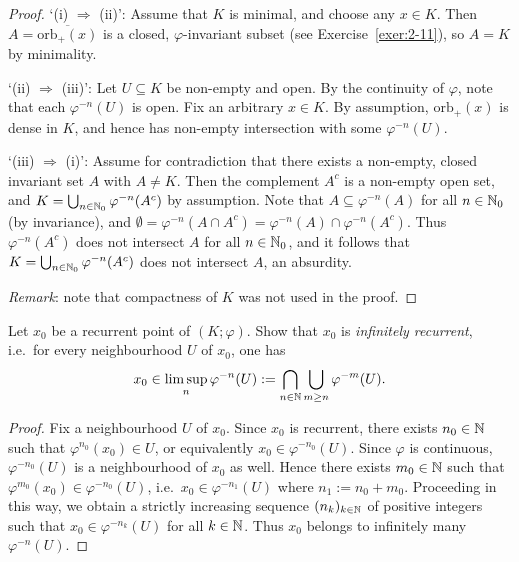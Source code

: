 \begin{proof}
	`(i) $\Rightarrow$ (ii)': Assume that $K$ is minimal, and choose any $x\in K$. Then $A = \overline{\mathrm{orb}_+(x)}$ is a closed, $\varphi$-invariant subset (see Exercise~\ref{exer:2-11}), so $A=K$ by minimality.
	
	`(ii) $\Rightarrow$ (iii)': Let $U \subseteq K$ be non-empty and open. By the continuity of $\varphi$, note that each $\varphi^{-n}(U)$ is open. Fix an arbitrary $x\in K$. By assumption, $\mathrm{orb}_+(x)$ is dense in $K$, and hence has non-empty intersection with some $\varphi^{-n}(U)$.
	
	`(iii) $\Rightarrow$ (i)': Assume for contradiction that there exists a non-empty, closed invariant set $A$ with $A \ne K$. Then the complement $A^c$ is a non-empty open set, and $K = \bigcup_{n\in\mathbb{N}_0} \varphi^{-n}(A^c)$ by assumption. Note that $A \subseteq \varphi^{-n}(A)$ for all $n\in\mathbb{N}_0$ (by invariance), and $\emptyset = \varphi^{-n}(A \cap A^c) = \varphi^{-n}(A) \cap \varphi^{-n}(A^c)$. Thus $\varphi^{-n}(A^c)$ does not intersect $A$ for all $n\in\mathbb{N}_0$, and it follows that $K = \bigcup_{n\in\mathbb{N}_0} \varphi^{-n}(A^c)$ does not intersect $A$, an absurdity.
	
	\emph{Remark}: note that compactness of $K$ was not used in the proof.
\end{proof}

\begin{exercise}[Exercise 3.6]
	Let $x_0$ be a recurrent point of $(K;\varphi)$. Show that $x_0$ is \emph{infinitely recurrent}, i.e.\ for every neighbourhood $U$ of $x_0$, one has
	\begin{equation*}
		x_0 \in \limsup_n \varphi^{-n}(U) := \bigcap_{n\in\mathbb{N}} \bigcup_{m\ge n} \varphi^{-m}(U).
	\end{equation*}
\end{exercise}

\begin{proof}
	Fix a neighbourhood $U$ of $x_0$. Since $x_0$ is recurrent, there exists $n_0\in\mathbb{N}$ such that $\varphi^{n_0}(x_0) \in U$, or equivalently $x_0 \in \varphi^{-n_0}(U)$. Since $\varphi$ is continuous, $\varphi^{-n_0}(U)$ is a neighbourhood of $x_0$ as well. Hence there exists $m_0 \in \mathbb{N}$ such that $\varphi^{m_0}(x_0) \in \varphi^{-n_0}(U)$, i.e.\ $x_0 \in \varphi^{-n_1}(U)$ where $n_1 := n_0+m_0$. Proceeding in this way, we obtain a strictly increasing sequence $(n_k)_{k\in\mathbb{N}}$ of positive integers such that $x_0 \in \varphi^{-n_k}(U)$ for all $k\in\mathbb{N}$. Thus $x_0$ belongs to infinitely many $\varphi^{-n}(U)$.
\end{proof}